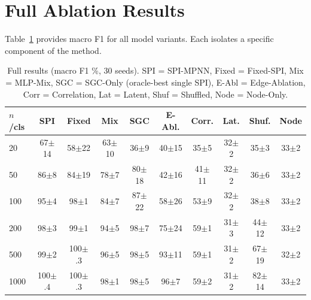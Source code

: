 \documentclass{article}
\begin{document}



\newpage
\appendix
\onecolumn

\section{Full Ablation Results}
\label{app:ablation}

Table~\ref{tab:full} provides macro F1 for all model variants. Each isolates a specific component of the method.

\begin{table}[h]
\caption{Full results (macro F1 \%, 30 seeds). SPI = SPI-MPNN, Fixed = Fixed-SPI, Mix = MLP-Mix, SGC = SGC-Only (oracle-best single SPI), E-Abl = Edge-Ablation, Corr = Correlation, Lat = Latent, Shuf = Shuffled, Node = Node-Only.}
\label{tab:full}
\vskip 0.1in
\begin{center}
\begin{small}
\begin{tabular}{lccccccccc}
\toprule
$n$/cls & SPI & Fixed & Mix & SGC & E-Abl. & Corr. & Lat. & Shuf. & Node \\
\midrule
20   & 67{\scriptsize$\pm$14} & 58{\scriptsize$\pm$22} & 63{\scriptsize$\pm$10} & 36{\scriptsize$\pm$9}  & 40{\scriptsize$\pm$15} & 35{\scriptsize$\pm$5}  & 32{\scriptsize$\pm$2} & 35{\scriptsize$\pm$3} & 33{\scriptsize$\pm$2} \\
50   & 86{\scriptsize$\pm$8}  & 84{\scriptsize$\pm$19} & 78{\scriptsize$\pm$7}  & 80{\scriptsize$\pm$18} & 42{\scriptsize$\pm$16} & 41{\scriptsize$\pm$11} & 32{\scriptsize$\pm$2} & 36{\scriptsize$\pm$6} & 33{\scriptsize$\pm$2} \\
100  & 95{\scriptsize$\pm$4}  & 98{\scriptsize$\pm$1}  & 84{\scriptsize$\pm$7}  & 87{\scriptsize$\pm$22} & 58{\scriptsize$\pm$26} & 53{\scriptsize$\pm$9}  & 32{\scriptsize$\pm$2} & 38{\scriptsize$\pm$8} & 33{\scriptsize$\pm$2} \\
200  & 98{\scriptsize$\pm$3}  & 99{\scriptsize$\pm$1}  & 94{\scriptsize$\pm$5}  & 98{\scriptsize$\pm$7}  & 75{\scriptsize$\pm$24} & 59{\scriptsize$\pm$1}  & 31{\scriptsize$\pm$3} & 44{\scriptsize$\pm$12}& 33{\scriptsize$\pm$2} \\
500  & 99{\scriptsize$\pm$2}  & 100{\scriptsize$\pm$.3}& 96{\scriptsize$\pm$5}  &  98{\scriptsize$\pm$5}  & 93{\scriptsize$\pm$11}& 59{\scriptsize$\pm$1}  & 31{\scriptsize$\pm$2} & 67{\scriptsize$\pm$19}& 32{\scriptsize$\pm$2} \\
1000 & 100{\scriptsize$\pm$.4}& 100{\scriptsize$\pm$.3}& 98{\scriptsize$\pm$1}  &  98{\scriptsize$\pm$5}  & 96{\scriptsize$\pm$7} & 59{\scriptsize$\pm$2}  & 31{\scriptsize$\pm$2} & 82{\scriptsize$\pm$14}& 33{\scriptsize$\pm$2} \\
\bottomrule
\end{tabular}
\end{small}
\end{center}
\vskip 0.1in
\end{table}
\end{document}
